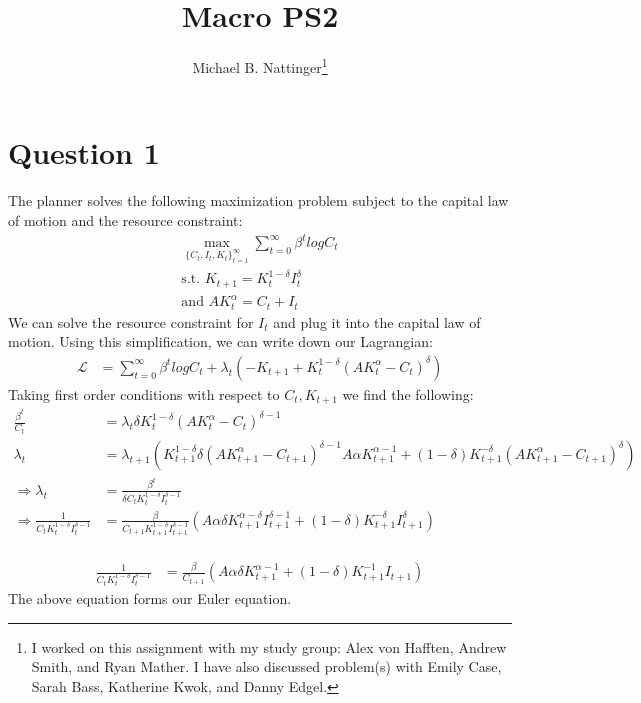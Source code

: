 \documentclass[11pt]{article} %
\title{Macro PS2}
\author{Michael B. Nattinger\footnote{I worked on this assignment with my study group: Alex von Hafften, Andrew Smith, and Ryan Mather. I have also discussed problem(s) with Emily Case, Sarah Bass, Katherine Kwok, and Danny Edgel.}}
\begin{document}
\maketitle
\section{Question 1}
The planner solves the following maximization problem subject to the capital law of motion and the resource constraint:
\begin{align*}
\max_{\{ C_t,I_t, K_t\}_{t=1}^{\infty}} \sum_{t=0}^{\infty} \beta^t log C_t\\
\text{s.t. } K_{t+1} = K_t^{1-\delta}I_t^{\delta}\\
\text{and } AK_t^{\alpha} = C_t + I_t
\end{align*}
We can solve the resource constraint for $I_t$ and plug it into the capital law of motion. Using this simplification, we can write down our Lagrangian:
\begin{align*}
\mathcal{L} &= \sum_{t=0}^{\infty} \beta^t log C_t + \lambda_t\left(-K_{t+1}+ K_t^{1-\delta}\left( AK_t^{\alpha}  - C_t \right)^{\delta}\right)
\end{align*}
Taking first order conditions with respect to $C_t,K_{t+1}$ we find the following:
\begin{align*}
\frac{\beta^t}{C_t} &= \lambda_t \delta K_t^{1-\delta}(AK_t^{\alpha}  - C_t )^{\delta - 1}\\
\lambda_t &= \lambda_{t+1}(K_{t+1}^{1-\delta}\delta(AK_{t+1}^{\alpha}  - C_{t+1} )^{\delta - 1}A\alpha K_{t+1}^{\alpha - 1} + (1-\delta)K_{t+1}^{-\delta} \left( AK_{t+1}^{\alpha}  - C_{t+1} \right)^{\delta})\\
\Rightarrow \lambda_t &= \frac{\beta^t}{\delta C_tK_t^{1-\delta}I_t^{\delta - 1}} \\
\Rightarrow  \frac{1}{C_tK_t^{1-\delta}I_t^{\delta - 1}}  &=  \frac{\beta}{C_{t+1}K_{t+1}^{1-\delta}I_{t+1}^{\delta - 1}}(A\alpha \delta K_{t+1}^{\alpha - \delta}I_{t+1}^{\delta - 1} + (1-\delta)K_{t+1}^{-\delta}I_{t+1}^{\delta})\\
\end{align*}

\begin{align}
\frac{1}{C_tK_t^{1-\delta}I_t^{\delta - 1}}  &= \frac{\beta}{C_{t+1}}(A\alpha \delta K_{t+1}^{\alpha - 1} + (1-\delta)K_{t+1}^{-1}I_{t+1}) \label{eul}
\end{align}
The above equation forms our Euler equation.
\end{document}
